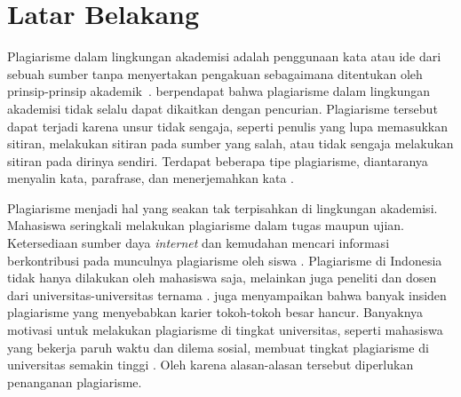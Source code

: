 

\section{Latar Belakang}

Plagiarisme dalam lingkungan akademisi adalah penggunaan kata atau ide dari
sebuah sumber tanpa menyertakan pengakuan sebagaimana ditentukan oleh
prinsip-prinsip akademik~\parencite{meuschke2013state}.
\textcite{meuschke2013state} berpendapat bahwa plagiarisme dalam lingkungan
akademisi tidak selalu dapat dikaitkan dengan pencurian. Plagiarisme tersebut
dapat terjadi karena unsur tidak sengaja, seperti penulis yang lupa memasukkan
sitiran, melakukan sitiran pada sumber yang salah, atau tidak sengaja melakukan
sitiran pada dirinya sendiri. Terdapat beberapa tipe plagiarisme, diantaranya
menyalin kata, parafrase, dan menerjemahkan kata \parencite{kiss2013loopholes}.

Plagiarisme menjadi hal yang seakan tak terpisahkan di lingkungan akademisi.
Mahasiswa seringkali melakukan plagiarisme dalam tugas maupun
ujian. Ketersediaan sumber daya \emph{internet} dan kemudahan mencari informasi
berkontribusi pada munculnya plagiarisme oleh siswa \parencite{born2003teaching}.
Plagiarisme di Indonesia tidak hanya dilakukan oleh mahasiswa saja, melainkan
juga peneliti dan dosen dari universitas-universitas ternama
\parencite{agustina2017exploring}. \textcite{kiss2013loopholes} juga
menyampaikan bahwa banyak insiden plagiarisme yang menyebabkan karier
tokoh-tokoh besar hancur. Banyaknya motivasi untuk melakukan plagiarisme
di tingkat universitas, seperti mahasiswa yang bekerja paruh waktu dan
dilema sosial, membuat tingkat plagiarisme di universitas semakin tinggi
\parencite{park2004rebels}. Oleh karena alasan-alasan tersebut diperlukan
penanganan plagiarisme.

